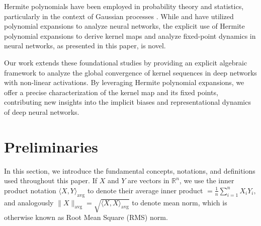 \documentclass[twoside]{article}
\newcommand{\avg}{\text{avg}}
\newcommand{\E}{\E}
\theoremstyle{definition}
\begin{document}
Hermite polynomials have been employed in probability theory and statistics, particularly in the context of Gaussian processes \citep{williams2006gaussian}. While \citet{poole2016exponential} and \citet{daniely2016toward} have utilized polynomial expansions to analyze neural networks, the explicit use of Hermite polynomial expansions to derive kernel maps and analyze fixed-point dynamics in neural networks, as presented in this paper, is novel.

Our work extends these foundational studies by providing an explicit algebraic framework to analyze the global convergence of kernel sequences in deep networks with non-linear activations. By leveraging Hermite polynomial expansions, we offer a precise characterization of the kernel map and its fixed points, contributing new insights into the implicit biases and representational dynamics of deep neural networks.

\section{Preliminaries}
In this section, we introduce the fundamental concepts, notations, and definitions used throughout this paper. 
If $X$ and $Y$ are vectors in $\mathbb{R}^n$, we use the inner product notation $\langle X, Y \rangle_\avg$ to denote their average inner product $ = \frac{1}{n} \sum_{i=1}^n X_i Y_i,$ and analogously $\|X\|_\avg = \sqrt{\langle X, X \rangle_\avg}$ to denote mean norm, which is otherwise known as Root Mean Square (RMS) norm. 

\end{document}
